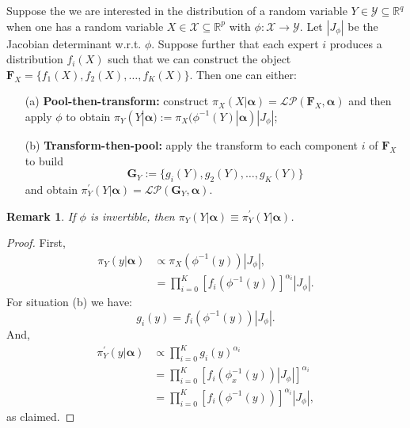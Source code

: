 \documentclass[a4paper, notitlepage, 10pt]{article}
\newtheorem{remark}{Remark}[]
\begin{document}
Suppose the we are interested in the distribution of a random variable $Y \in \mathcal{Y}\subseteq \mathbb{R}^q$  when one has a random variable $X \in \mathcal{X} \subseteq \mathbb{R}^p$ with $\phi : \mathcal{X} \to \mathcal{Y}$.
Let $|J_\phi|$ be the Jacobian determinant w.r.t. $\phi$.
Suppose further that each expert $i$ produces a distribution $f_i(X)$ such that we can construct the object $\mathbf{F}_X = \{f_1(X), f_2(X), \ldots, f_K(X) \}$.
Then one can either:
\begin{itemize}
 \item[(a)] \textbf{Pool-then-transform:} construct $\pi_X(X | \boldsymbol \alpha) = \mathcal{LP}(\mathbf{F}_X, \boldsymbol \alpha)$ and then apply $\phi$ to obtain $\pi_Y(Y | \boldsymbol \alpha) := \pi_X( \phi^{-1}(Y)| \boldsymbol\alpha) |J_\phi|$;
 \item[(b)] \textbf{Transform-then-pool:} apply the transform to each component $i$ of $\mathbf{F}_X$ to build
 \[\mathbf{G}_{Y}:= \{g_i(Y), g_2(Y), \ldots, g_K(Y)\} \]
 and obtain $\pi_Y^{\prime}(Y |  \boldsymbol \alpha) = \mathcal{LP}(\mathbf{G}_{Y},  \boldsymbol \alpha)$.
\end{itemize}

\begin{remark}
\label{rmk:invariance}
If $\phi$ is invertible, then $\pi_Y(Y | \boldsymbol \alpha) \equiv \pi_Y^{\prime}(Y|  \boldsymbol \alpha)$.
\end{remark}
\begin{proof}
First, 
\begin{align}
 \pi_Y(y | \boldsymbol \alpha) & \propto \pi_{X}(\phi^{-1}(y))|J_\phi|, \\
&= \prod_{i = 0}^K \left[ f_i(\phi^{-1}(y)) \right]^{\alpha_i}|J_\phi|.
\end{align}
For situation (b) we have:
\begin{equation}
 g_i(y) = f_i(\phi^{-1}(y))|J_\phi|.
\end{equation}
And,
\begin{align}
 \pi_Y^{\prime}(y |  \boldsymbol \alpha) & \propto  \prod_{i=0}^K g_i(y)^{\alpha_i} \\
  & =  \prod_{i=0}^K \left[ f_i(\phi_x^{-1}(y))|J_\phi| \right]^{\alpha_i} \\
  & = \prod_{i = 0}^K \left[ f_i(\phi^{-1}(y)) \right]^{\alpha_i}|J_\phi|,
\end{align}
as claimed.
\end{proof}
\end{document}

